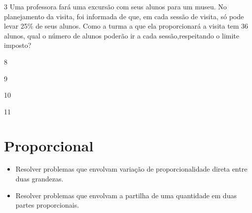 \num{3} Uma professora fará uma excursão com seus alunos para um museu. No
planejamento da visita, foi informada de que, em cada sessão de visita, só
pode levar 25\% de seus alunos. Como a turma a que ela proporcionará a
visita tem 36 alunos, qual o número de alunos poderão ir a cada sessão,respeitando o limite imposto?

\begin{minipage}{.5\textwidth}
\begin{escolha}
\item
  8
\item
  9
\item
  10
\item
  11
\end{escolha}
\end{minipage}

\chapter{Proporcional}



\begin{itemize}
\item Resolver problemas que envolvam variação de proporcionalidade direta
entre duas grandezas.

\item Resolver problemas que envolvam a partilha de uma quantidade em duas
partes proporcionais.
\end{itemize}

